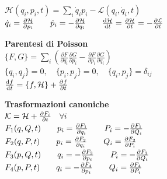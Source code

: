 \documentclass[a4paper,7pt]{article}
\begin{document}
\begin{minipage}{0.45\textwidth}
		$\mathcal{H}(q_i,p_i,t)=\sum\limits_{i}\dot{q}_ip_i-\mathcal{L}(q_i,\dot{q}_i,t)$\\
		
		$\dot{q}_i=\pdv{\mathcal{H}}{p_i}\qquad \dot{p}_i=-\pdv{\mathcal{H}}{q_i}\qquad \dv{\mathcal{H}}{t}=\pdv{\mathcal{H}}{t}=-\pdv{\mathcal{L}}{t}$	\\
		\vspace{0.5 cm}
		
		\textbf{Parentesi di Poisson}\\
		
		$\{F, G\} = \sum_{i} \left( \frac{\partial F}{\partial q_i}\frac{\partial G}{\partial p_i} - \frac{\partial F}{\partial p_i}\frac{\partial G}{\partial q_i} \right)$\\
		
		$\{q_i, q_j\}=0, \quad \{p_i, p_j\}=0, \quad \{q_i, p_j\}=\delta_{ij} $\\
		
		$\dv{f}{t}=\left\{f,\mathcal{H}\right\}+\pdv{f}{t}$
		
		\vspace{0.5 cm}
		
		\textbf{Trasformazioni canoniche}\\
		
		$\mathcal{K}=\mathcal{H}+\pdv{F_i}{t}\quad \forall i$\\
		
		$F_1(q,Q,t)\qquad p_i=\pdv{F_1}{q_i}\qquad P_i=-\pdv{F_1}{Q_i}$\\
		
		$F_2(q,P,t)\qquad p_i=\pdv{F_2}{q_i}\qquad Q_i=\pdv{F_2}{P_i}$\\
		
		$F_3(p,Q,t)\qquad q_i=-\pdv{F_3}{p_i}\qquad P_i=-\pdv{F_3}{Q_i}$\\
		
		$F_4(p,P,t)\qquad q_i=-\pdv{F_4}{p_i}\qquad Q_i=\pdv{F_4}{P_i}$\\
		
		
	\end{minipage}
	
	
\end{document}
